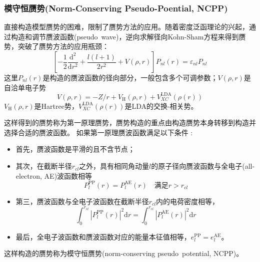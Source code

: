 {\subsubsection{模守恒赝势\textrm(Norm-Conserving Pseudo-Poential, NCPP)}
直接构造模型赝势的困难，限制了赝势方法的应用。随着密度泛函理论的兴起，通过构造和调节赝波函数(pseudo~wave)，逆向求解径向Kohn-Sham方程来得到赝势，突破了赝势方法的应用瓶颈：
\begin{equation}
	\left[-\frac12\frac{\mathrm{d}^2}{\mathrm{d}r^2}+\frac{l(l+1)}{2r^2}+V(\rho,r)\right]P_{nl}(r)=\varepsilon_{nl}P_{nl}
  \label{eq:solid-103}
\end{equation}
这里$P_{nl}(r)$是构造的赝波函数的径向部分，一般包含多个可调参数；$V(\rho,r)$是自洽单电子势$$V(\rho,r)=-Z/r+V_{\mathrm{H}}(\rho,r)+V_{XC}^{\mathrm{LDA}}(\rho(r))$$
$V_{\mathrm{H}}(\rho,r)$是Hartree势，$V_{XC}^{\mathrm{LDA}}(\rho(r))$是LDA的交换-相关势。

这样得到的赝势称为第一原理赝势，赝势构造的重点由构造赝势本身转移到构造并选择合适的赝波函数。%
如果第一原理赝波函数满足以下条件%
:
\begin{itemize}
	\item 首先，赝波函数是平滑的且不含节点；
	\item 其次，在截断半径$r_{cl}$之外\cite{JPC13-L189_1980,PRB43-1993_1991}，具有相同角动量$l$的原子径向赝波函数与全电子(all-electron, AE)波函数相等%
\begin{equation}
	P_l^{\mathrm{PP}}(r)=P_l^{\mathrm{AE}}(r)\quad \mbox{满足}r>r_{cl}
  \label{eq:solid-104}
\end{equation}
	\item 第三，赝波函数与全电子波函数在截断半径$r_{cl}$内的电荷密度相等\cite{PRL43-1494_1979,PRB43-1993_1991}，
\begin{equation} 
	\int_0^{r_{cl}}|P_l^{\mathrm{PP}}(r)|^2\mathrm{d}r=\int_0^{r_{cl}}|P_l^{\mathrm{AE}}(r)|^2\mathrm{d}r
  \label{eq:solid-105}
\end{equation}
	\item 最后，全电子波函数和赝波函数对应的能量本征值相等，$e_l^{\mathrm{PP}}=e_l^{\mathrm{AE}}$。
\end{itemize}
这样构造的赝势称为模守恒赝势(norm-conserving pseudo~potential, NCPP)\cite{PRL43-1494_1979}。

}
